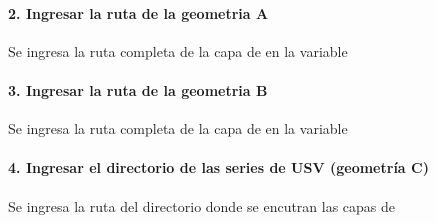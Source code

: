 \documentclass[letterpaper,10pt,spanish]{sphinxmanual}
\begin{document}
\noindent{}


\paragraph{2. Ingresar la ruta de la geometria A}
\label{\detokenize{nivel_geometrias:ingresar-la-ruta-de-la-geometria-a}}
Se ingresa la ruta completa de la capa de  en la variable

\begin{sphinxVerbatim}[commandchars=\\\{\}]
  
\end{sphinxVerbatim}


\paragraph{3. Ingresar la ruta de la geometria B}
\label{\detokenize{nivel_geometrias:ingresar-la-ruta-de-la-geometria-b}}
Se ingresa la ruta completa de la capa de  en la variable

\begin{sphinxVerbatim}[commandchars=\\\{\}]
  
\end{sphinxVerbatim}


\paragraph{4. Ingresar el directorio de las series de USV (geometría C)}
\label{\detokenize{nivel_geometrias:ingresar-el-directorio-de-las-series-de-usv-geometria-c}}
Se ingresa la ruta del directorio donde se encutran las capas
de 

\begin{sphinxVerbatim}[commandchars=\\\{\}]
  
\end{sphinxVerbatim}
\end{document}
